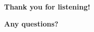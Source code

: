 \begin{frame}[plain]
  \vspace{1.5cm}
  \begin{center}
    {\Huge\bfseries\textcolor{primaryblue}{Thank you for listening!}\par}
    
    \vspace{0.8cm}
    {\LARGE\textbf{Any questions?}\par}
  \end{center}
\end{frame}

